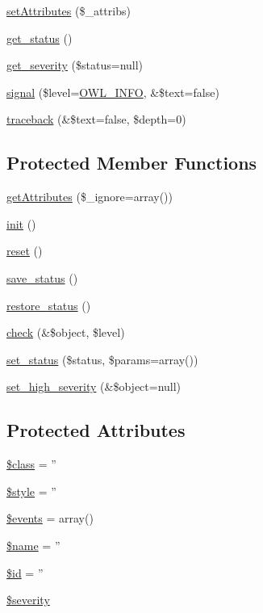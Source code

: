 \begin{DoxyCompactItemize}
\hyperlink{classBaseElement_aa623b042d23a5b77add8b3c452ec5855}{setAttributes} (\$\_\-attribs)
\item 
\hyperlink{class__OWL_a99ec771fa2c5c279f80152cc09e489a8}{get\_\-status} ()
\item 
\hyperlink{class__OWL_adf9509ef96858be7bdd9414c5ef129aa}{get\_\-severity} (\$status=null)
\item 
\hyperlink{class__OWL_a51ba4a16409acf2a2f61f286939091a5}{signal} (\$level=\hyperlink{owl_8severitycodes_8php_a139328861128689f2f4def6a399d9057}{OWL\_\-INFO}, \&\$text=false)
\item 
\hyperlink{class__OWL_aa29547995d6741b7d2b90c1d4ea99a13}{traceback} (\&\$text=false, \$depth=0)
\end{DoxyCompactItemize}
\subsection*{Protected Member Functions}
\begin{DoxyCompactItemize}
\item 
\hyperlink{classBaseElement_ae8237038633fc53db818f36da1940297}{getAttributes} (\$\_\-ignore=array())
\item 
\hyperlink{class__OWL_ae0ef3ded56e8a6b34b6461e5a721cd3e}{init} ()
\item 
\hyperlink{class__OWL_a2f2a042bcf31965194c03033df0edc9b}{reset} ()
\item 
\hyperlink{class__OWL_a9e49b9c76fbc021b244c6915ea536d71}{save\_\-status} ()
\item 
\hyperlink{class__OWL_a465eeaf40edd9f9c848841700c32ce55}{restore\_\-status} ()
\item 
\hyperlink{class__OWL_ad6f4f6946f40199dd0333cf219fa500e}{check} (\&\$object, \$level)
\item 
\hyperlink{class__OWL_aea912d0ede9b3c2a69b79072d94d4787}{set\_\-status} (\$status, \$params=array())
\item 
\hyperlink{class__OWL_a576829692a3b66e3d518853bf43abae3}{set\_\-high\_\-severity} (\&\$object=null)
\end{DoxyCompactItemize}
\subsection*{Protected Attributes}
\begin{DoxyCompactItemize}
\item 
\hyperlink{classBaseElement_a99976a8e967db92e7800309f359b0803}{\$class} = ''
\item 
\hyperlink{classBaseElement_a429a3d642dd95f30e1059ef29564b87d}{\$style} = ''
\item 
\hyperlink{classBaseElement_a02cebe45d277b4ff8f29db08bad371ba}{\$events} = array()
\item 
\hyperlink{classBaseElement_a30b8cff187a9de659a70daf287d66f45}{\$name} = ''
\item 
\hyperlink{classBaseElement_a11b6989c43b53869a09f5ce65aa55b45}{\$id} = ''
\item 
\hyperlink{class__OWL_ad26b40a9dbbacb33e299b17826f8327c}{\$severity}
\end{DoxyCompactItemize}
